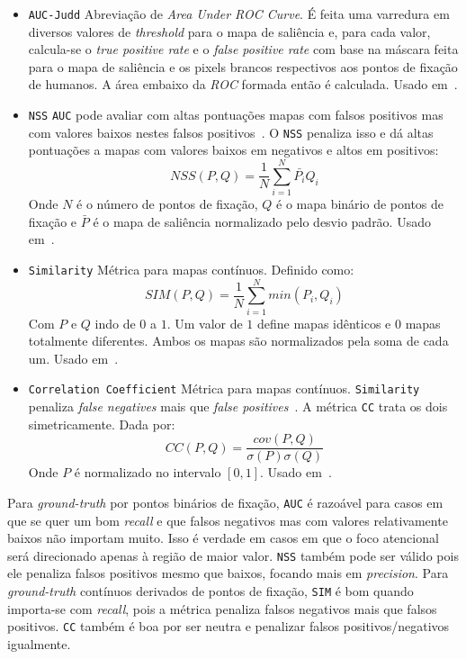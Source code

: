 \documentclass[article]{IEEEtran}
\newcommand{\tit}[1]{\textit{#1}}
\newcommand{\ttt}[1]{\texttt{#1}}
\begin{document}
\begin{itemize}
	\item \ttt{AUC-Judd}\newline
	Abreviação de \tit{Area Under ROC Curve}. É feita uma varredura em diversos
	valores de \tit{threshold} para o mapa de saliência e, para cada valor,
	calcula-se o \tit{true positive rate} e o \tit{false positive rate} com
	base na máscara feita para o mapa de saliência e os pixels brancos
	respectivos aos pontos de fixação de humanos.
	A área embaixo da \tit{ROC} formada então é calculada.
	Usado em~\cite{mit-300, juddBM}.

	\item \ttt{NSS}\newline
	\ttt{AUC} pode avaliar com altas pontuações mapas com falsos positivos
	mas com valores baixos nestes falsos positivos~\cite{judd2}.
	O \ttt{NSS} penaliza isso e dá altas pontuações a mapas com valores
	baixos em negativos e altos em positivos:
	$$NSS(P, Q) = \frac{1}{N}\sum\limits_{i=1}^N{\bar{P_{i}}Q_{i}}$$
	Onde $N$ é o número de pontos de fixação,
	$Q$ é o mapa binário de pontos de fixação e $\bar{P}$ é o mapa de
	saliência normalizado pelo desvio padrão.
	Usado em~\cite{mit-300}.

	\item \ttt{Similarity}\newline
	Métrica para mapas contínuos. Definido como:
	$$SIM(P, Q) = \frac{1}{N}\sum\limits_{i=1}^N{min(P_i, Q_i)}$$
	Com $P$ e $Q$ indo de $0$ a $1$. Um valor de $1$ define mapas idênticos
	e $0$ mapas totalmente diferentes.
	Ambos os mapas são normalizados pela soma de cada um.
	Usado em~\cite{mit-300}.

	\item \ttt{Correlation Coefficient}\newline
	Métrica para mapas contínuos.
	\ttt{Similarity} penaliza \tit{false negatives} mais que
	\tit{false positives}~\cite{judd2}. A métrica \ttt{CC} trata os dois
	simetricamente. Dada por:
	$$CC(P, Q) = \frac{cov(P,Q)}{\sigma(P)\sigma(Q)}$$
	Onde $P$ é normalizado no intervalo $[0, 1]$.
	Usado em~\cite{mit-300}.
\end{itemize}

Para \tit{ground-truth} por pontos binários de fixação,
\ttt{AUC} é razoável para casos em que se quer um
bom \tit{recall} e que falsos negativos mas com valores relativamente baixos
não importam muito. Isso é verdade em casos em que o foco atencional será
direcionado apenas à região de maior valor.
\ttt{NSS} também pode ser válido pois ele penaliza falsos positivos mesmo
que baixos, focando mais em \tit{precision}.
Para \tit{ground-truth} contínuos derivados de pontos de fixação,
\ttt{SIM} é bom quando importa-se com \tit{recall}, pois a métrica penaliza
falsos negativos mais que falsos positivos.
\ttt{CC} também é boa por ser neutra e penalizar falsos positivos/negativos
igualmente.
\end{document}
